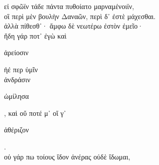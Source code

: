 \documentclass{ransom}
\begin{document}
\begin{foreignpage}
\begin{graytext}
εἰ σφῶϊν τάδε πάντα πυθοίατο μαρναμένοιϊν,\\
οἳ περὶ μὲν βουλὴν Δαναῶν, περὶ δ᾽ ἐστὲ μάχεσθαι.\\
ἀλλὰ πίθεσθ᾽· ἄμφω δὲ νεωτέρω ἐστὸν ἐμεῖο·\\
ἤδη γάρ ποτ᾽ ἐγὼ καὶ \begin{whitetext}ἀρείοσιν\end{whitetext} ἠέ περ ὑμῖν\hfill{}\\
ἀνδράσιν \begin{whitetext}ὡμίλησα\end{whitetext}, καὶ οὔ ποτέ μ᾽ οἵ γ᾽ \begin{whitetext}ἀθέριζον\end{whitetext}.\\
οὐ γάρ πω τοίους ἴδον ἀνέρας οὐδὲ ἴδωμαι,\\

\end{graytext}


\end{foreignpage}
\end{document}

